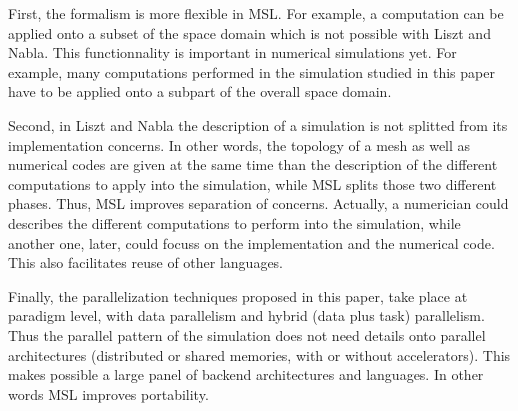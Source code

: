 First, the formalism is more flexible in MSL. For example, a computation can be applied onto a subset of the space domain which is not possible with Liszt and Nabla. This functionnality is important in numerical simulations yet. For example, many computations performed in the simulation studied in this paper have to be applied onto a subpart of the overall space domain.

Second, in Liszt and Nabla the description of a simulation is not splitted from its implementation concerns. In other words, the topology of a mesh as well as numerical codes are given at the same time than the description of the different computations to apply into the simulation, while MSL splits those two different phases. Thus, MSL improves separation of concerns. Actually, a numerician could describes the different computations to perform into the simulation, while another one, later, could focuss on the implementation and the numerical code. This also facilitates reuse of other languages. 

Finally, the parallelization techniques proposed in this paper, take place at paradigm level, with data parallelism and hybrid (data plus task) parallelism. Thus the parallel pattern of the simulation does not need details onto parallel architectures (distributed or shared memories, with or without accelerators). This makes possible a large panel of backend architectures and languages. In other words MSL improves portability.